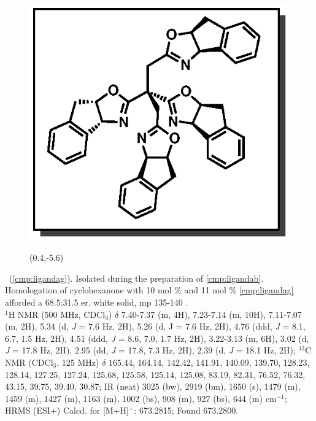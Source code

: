 \vspace{10pt}
\begin{figure}
  \vspace{-30pt}
  \begin{center}
    \includegraphics[scale=0.8]{chp_asymmetric/images/ligandag}
           \begin{textblock}{1}(0.4,-5.6)  \end{textblock}
  \end{center}
  \vspace{-30pt}
\end{figure}
\noindent \textbf{\CMPligandag}\ (\ref{cmp:ligandag}). Isolated  during the preparation of
\ref{cmp:ligandab}. Homologation of cyclohexanone with 10 mol \%  and 11 mol \%
\ref{cmp:ligandag} afforded a 68.5:31.5 er.
white solid, mp 135-140 \degc.\\
$^1$H NMR (500 MHz, CDCl$_3$) $\delta$ 7.40-7.37 (m, 4H), 7.23-7.14 (m, 10H), 7.11-7.07 (m, 2H),
5.34 (d, \textit{J} = 7.6 Hz, 2H), 5.26 (d, J = 7.6 Hz, 2H), 4.76 (ddd, \textit{J} = 8.1, 6.7, 1.5
Hz, 2H), 4.51 (ddd, \textit{J} = 8.6, 7.0, 1.7 Hz, 2H), 3.22-3.13 (m, 6H), 3.02 (d, \textit{J} =
17.8 Hz, 2H), 2.95 (dd, \textit{J} = 17.8, 7.3 Hz, 2H), 2.39 (d, \textit{J} = 18.1 Hz, 2H); $^{13}$C
NMR (CDCl$_3$, 125 MHz) $\delta$ 165.44, 164.14, 142.42, 141.91, 140.09, 139.70, 128.23, 128.14,
127.25, 127.24, 125.68, 125.58, 125.14, 125.08, 83.19, 82.31, 76.52, 76.32, 43.15, 39.75, 39.40,
30.87; IR (neat) 3025 (bw), 2919 (bm), 1650 (s), 1479 (m), 1459 (m), 1427 (m), 1163 (m), 1002 (bs),
908 (m), 927 (bs), 644 (m) cm$^{-1}$; HRMS (ESI+) Calcd. for  [M+H]$^+$: 673.2815;
Found 673.2800.

